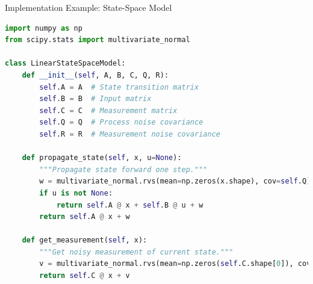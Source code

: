 \documentclass[aspectratio=169]{beamer}
\begin{document}
\begin{frame}[fragile]{Implementation Example: State-Space Model}
\begin{lstlisting}[language=Python]
import numpy as np
from scipy.stats import multivariate_normal

class LinearStateSpaceModel:
    def __init__(self, A, B, C, Q, R):
        self.A = A  # State transition matrix
        self.B = B  # Input matrix
        self.C = C  # Measurement matrix
        self.Q = Q  # Process noise covariance
        self.R = R  # Measurement noise covariance
        
    def propagate_state(self, x, u=None):
        """Propagate state forward one step."""
        w = multivariate_normal.rvs(mean=np.zeros(x.shape), cov=self.Q)
        if u is not None:
            return self.A @ x + self.B @ u + w
        return self.A @ x + w
    
    def get_measurement(self, x):
        """Get noisy measurement of current state."""
        v = multivariate_normal.rvs(mean=np.zeros(self.C.shape[0]), cov=self.R)
        return self.C @ x + v
\end{lstlisting}
\end{frame}
\end{document}

